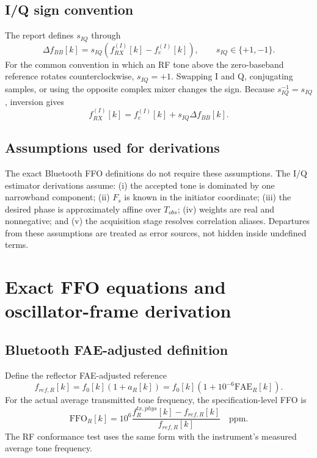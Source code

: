 \documentclass[10pt,a4paper]{article}
\newcommand{\FFO}{\mathrm{FFO}}
\newcommand{\FAE}{\mathrm{FAE}}
\begin{document}
\subsection{I/Q sign convention}
The report defines $s_{IQ}$ through
\begin{equation}
\Delta f_{BB}[k]=s_{IQ}\left(f_{RX}^{(I)}[k]-f_c^{(I)}[k]\right),
\qquad s_{IQ}\in\{+1,-1\}.
\label{eq:bbdef}
\end{equation}
For the common convention in which an RF tone above the zero-baseband reference rotates counterclockwise, $s_{IQ}=+1$. Swapping I and Q, conjugating samples, or using the opposite complex mixer changes the sign. Because $s_{IQ}^{-1}=s_{IQ}$, inversion gives
\begin{equation}
f_{RX}^{(I)}[k]=f_c^{(I)}[k]+s_{IQ}\Delta f_{BB}[k].
\label{eq:bbinvert}
\end{equation}

\subsection{Assumptions used for derivations}
The exact Bluetooth FFO definitions do not require these assumptions. The I/Q estimator derivations assume: (i) the accepted tone is dominated by one narrowband component; (ii) $F_s$ is known in the initiator coordinate; (iii) the desired phase is approximately affine over $T_{obs}$; (iv) weights are real and nonnegative; and (v) the acquisition stage resolves correlation aliases. Departures from these assumptions are treated as error sources, not hidden inside undefined terms.

\clearpage
\section{Exact FFO equations and oscillator-frame derivation}
\label{sec:ffoderivation}
\subsection{Bluetooth FAE-adjusted definition}
Define the reflector FAE-adjusted reference
\begin{equation}
f_{ref,R}[k]=f_0[k]\left(1+a_R[k]\right)
=f_0[k]\left(1+10^{-6}\FAE_R[k]\right).
\label{eq:fref}
\end{equation}
For the actual average transmitted tone frequency, the specification-level FFO is
\begin{equation}
\FFO_R[k]=10^6
\frac{f_R^{tx,phys}[k]-f_{ref,R}[k]}{f_{ref,R}[k]}\quad\text{ppm}.
\label{eq:ffotx}
\end{equation}
The RF conformance test uses the same form with the instrument's measured average tone frequency.
\end{document}
